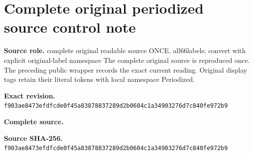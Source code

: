 \begingroup
\sloppy
\small
\makeatletter
\let\EndpointOriginalTagForm\tagform@
\def\tagform@#1{\EndpointOriginalTagForm{Periodized\, #1}}
\makeatother
\section{Complete original periodized source control note}
\noindent\textbf{Source role.} complete original readable source ONCE, all66labels; convert with explicit original-label namespace The complete original source is reproduced once. The preceding public wrapper records the exact current reading. Original display tags retain their literal tokens with local namespace Periodized.\par
\noindent\textbf{Exact revision.} \nolinkurl{f903ae8473efdfcde0f45a83878837289d2b0604c1a34903276d7c840fe972b9}\par
\noindent\textbf{Complete source.} \par
\noindent\textbf{Source SHA-256.} \nolinkurl{f903ae8473efdfcde0f45a83878837289d2b0604c1a34903276d7c840fe972b9}\par\medskip

\endgroup
